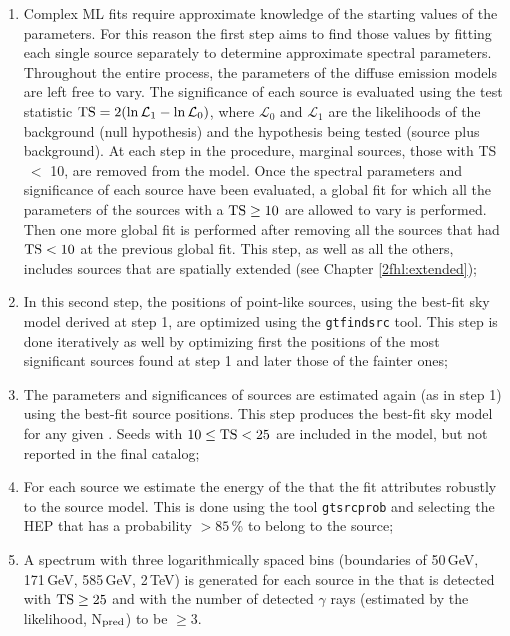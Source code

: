 \begin{enumerate}
	\item Complex ML fits require approximate knowledge of the 
	starting values of the parameters. For this reason the first
	step  aims to find those values  by fitting each single source separately 
	to determine approximate spectral parameters.
	Throughout the entire process, the parameters of the diffuse emission
	models are left free to vary.
	The significance of each source is evaluated using the test statistic  
	${\rm TS}=2(\ln \mathcal{L}_1 - \ln \mathcal{L}_0)$, where $\mathcal{L}_0$ and $\mathcal{L}_1$
	are the likelihoods of the background (null hypothesis) and 
	the hypothesis being tested (\eg source plus background). 
	At each step in the procedure, marginal sources, those with TS$ ~<$ 10, are removed from the model.
	Once the spectral parameters and significance of each source have
	been evaluated, a global fit for which all the parameters of the sources
	with a ${\rm TS}\geq 10$ are allowed to  vary is performed. 
	Then one more global fit is performed after removing all the sources that had ${\rm TS}< 10$ at the previous global fit.
	This step,
	as well as all the others, includes sources that
	are spatially extended (see Chapter \ref{2fhl:extended});
	
	\item In this second step, the positions of point-like sources, using the best-fit sky model
	derived at step 1, are optimized using the {\tt gtfindsrc} tool. This step
	is done iteratively as well by optimizing first the positions of the
	most significant sources found at step 1 and later  those of the fainter
	ones;
	
	\item The parameters and significances of sources are estimated again (as in step 1) using the best-fit source positions. This step produces the best-fit sky 
	model for any given \roi{}. 
	Seeds with $10\leq {\rm TS}<25$ are included in the model, but not reported in the final catalog;
	
	\item For each source we estimate the energy of the \hep{}
	that the fit attributes robustly  to the source model. This is done using the tool {\tt gtsrcprob} and selecting the HEP that has a probability $>85$\,\% to belong to the source;
	
	\item A  spectrum with three logarithmically spaced bins (boundaries of 50\,GeV, 171\,GeV, 585\,GeV, 2\,TeV) is generated for each source in the \roi{} that is detected with ${\rm TS}\geq 25$ and with the number of detected $\gamma$ rays (estimated by the likelihood, N$_{\rm pred}$) to be $\geq$3.
	
	
\end{enumerate}


